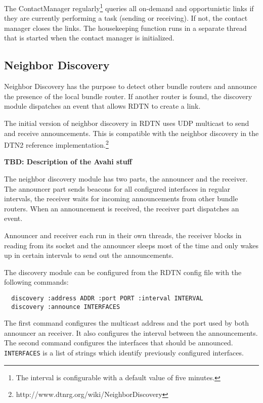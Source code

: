 \documentclass{article}
\begin{document}
The ContactManager regularly\footnote{The interval is configurable with a
default value of five minutes.} queries all on-demand and opportunistic links if
they are currently performing a task (sending or receiving). If not, the contact
manager closes the links.  The housekeeping function runs in a separate thread
that is started when the contact manager is initialized.

\subsection{Neighbor Discovery}\label{sec.discovery}

Neighbor Discovery has the purpose to detect other bundle routers and announce
the presence of the local bundle router. If another router is found, the
discovery module dispatches an event that allows RDTN to create a link.

The initial version of neighbor discovery in RDTN uses UDP multicast to send and
receive announcements. This is compatible with the neighbor discovery in the
DTN2 reference
implementation.\footnote{http://www.dtnrg.org/wiki/NeighborDiscovery} 

{\bf TBD: Description of the Avahi stuff}

The neighbor discovery module has two parts, the announcer and the receiver. The
announcer part sends beacons for all configured interfaces in regular intervals,
the receiver waits for incoming announcements from other bundle routers. When an
announcement is received, the receiver part dispatches an event.

Announcer and receiver each run in their own threads, the receiver blocks in
reading from its socket and the announcer sleeps most of the time and
only wakes up in certain intervals to send out the announcements.

The discovery module can be configured from the RDTN config file with the
following commands:

\begin{verbatim}
  discovery :address ADDR :port PORT :interval INTERVAL
  discovery :announce INTERFACES
\end{verbatim}

The first command configures the multicast address and the port used by both
announcer an receiver. It also configures the interval between the
announcements.  The second command configures the interfaces that should be
announced.  {\tt INTERFACES} is a list of strings which identify previously
configured interfaces.
\end{document}
